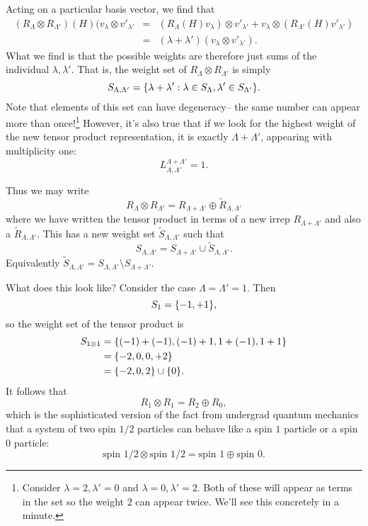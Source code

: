 Acting on a particular basis vector, we find that
\begin{eqnarray*}
(R_\Lambda \otimes R_{\Lambda'})(H)(v_\lambda \otimes v'_{\lambda'}&=&(R_\Lambda(H)v_\lambda) \otimes v'_{\lambda'}+v_\lambda \otimes (R_{\Lambda'}(H)v'_{\lambda'})\\
&=& (\lambda + \lambda')(v_\lambda \otimes v'_{\lambda'}).
\end{eqnarray*}
What we find is that the possible weights are therefore just sums of the individual $\lambda,\lambda'$. That is, the weight set of $R_\Lambda \otimes R_{\Lambda'}$ is simply
$$S_{\Lambda,\Lambda'}=\{\lambda+\lambda': \lambda\in S_{\Lambda},\lambda'\in S_{\Lambda'}\}.$$
Note that elements of this set can have degeneracy-- the same number can appear more than once!\footnote{Consider $\lambda=2,\lambda'=0$ and $\lambda=0,\lambda'=2$. Both of these will appear as terms in the set so the weight $2$ can appear twice. We'll see this concretely in a minute.} However, it's also true that if we look for the highest weight of the new tensor product representation, it is exactly $\Lambda+\Lambda'$, appearing with multiplicity one:
$$L^{\Lambda+\Lambda'}_{\Lambda,\Lambda'}=1.$$

Thus we may write
$$R_\Lambda \otimes R_{\Lambda'}=R_{\Lambda+\Lambda'}\oplus \tilde R_{\Lambda,\Lambda'}$$
where we have written the tensor product in terms of a new irrep $R_{\Lambda+\Lambda'}$ and also a  $\tilde R_{\Lambda,\Lambda'}$. This has a new weight set $\tilde S_{\Lambda, \Lambda'}$ such that
$$S_{\Lambda,\Lambda'}=S_{\Lambda+\Lambda'} \cup \tilde S_{\Lambda,\Lambda'}.$$
Equivalently $\tilde S_{\Lambda,\Lambda'}=S_{\Lambda,\Lambda'}\setminus S_{\Lambda+\Lambda'}.$

What does this look like? Consider the case $\Lambda=\Lambda'=1.$ Then
$$S_1=\{-1,+1\},$$
so the weight set of the tensor product is
\begin{align*}
S_{1\otimes 1}&=\{(-1)+(-1),(-1)+1,1+(-1),1+1\}\\
&=\{-2,0,0,+2\}\\
&=\{-2,0,2\}\cup \{0\}.
\end{align*}
It follows that
$$R_1\otimes R_1 = R_2 \oplus R_0,$$
which is the sophisticated version of the fact from undergrad quantum mechanics that a system of two spin $1/2$ particles can behave like a spin $1$ particle or a spin $0$ particle:
$$\text{spin }1/2 \otimes \text{spin } 1/2 = \text{spin }1 \oplus \text{spin } 0.$$